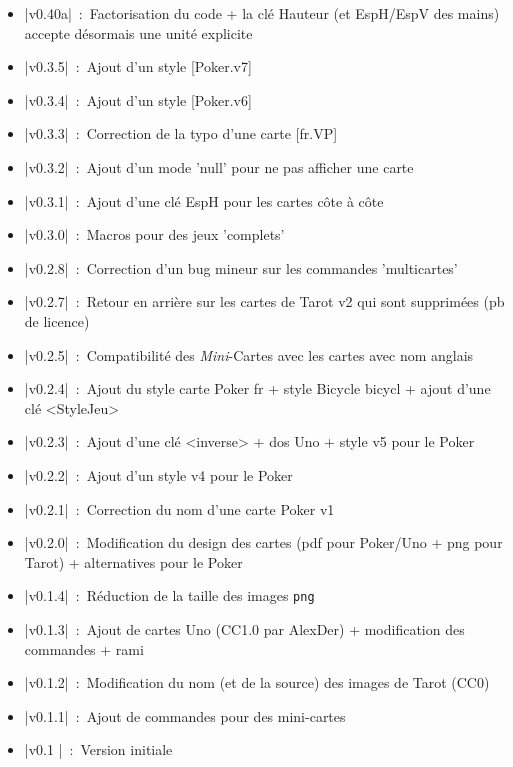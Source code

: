 \documentclass[a4paper]{article}
\begin{document}
{\small
\begin{itemize}[nosep,leftmargin=1.5em,itemindent=0pt]
  \item \bverb|v0.40a|~:~Factorisation du code + la clé \textsf{Hauteur} (et \textsf{EspH}/\textsf{EspV} des mains) accepte désormais une unité explicite
  \item \bverb|v0.3.5|~:~Ajout d'un style [Poker.v7]
  \item \bverb|v0.3.4|~:~Ajout d'un style [Poker.v6]
  \item \bverb|v0.3.3|~:~Correction de la typo d'une carte [fr.VP]
  \item \bverb|v0.3.2|~:~Ajout d'un mode 'null' pour ne pas afficher une carte
  \item \bverb|v0.3.1|~:~Ajout d'une clé \textsf{EspH} pour les cartes côte à côte
  \item \bverb|v0.3.0|~:~Macros pour des jeux 'complets'
  \item \bverb|v0.2.8|~:~Correction d'un bug mineur sur les commandes 'multicartes'
  \item \bverb|v0.2.7|~:~Retour en arrière sur les cartes de Tarot \textsf{v2} qui sont supprimées (pb de licence)
  \item \bverb|v0.2.5|~:~Compatibilité des \textit{Mini}-Cartes avec les cartes avec nom anglais
  \item \bverb|v0.2.4|~:~Ajout du style carte Poker \textsf{fr} + style Bicycle \textsf{bicycl} + ajout d'une clé \textsf{<StyleJeu>}
  \item \bverb|v0.2.3|~:~Ajout d'une clé \textsf{<inverse>} + dos Uno + style \textsf{v5} pour le Poker
  \item \bverb|v0.2.2|~:~Ajout d'un style \textsf{v4} pour le Poker
  \item \bverb|v0.2.1|~:~Correction du nom d'une carte Poker \textsf{v1}
  \item \bverb|v0.2.0|~:~Modification du design des cartes (pdf pour Poker/Uno + png pour Tarot) + alternatives pour le Poker
  \item \bverb|v0.1.4|~:~Réduction de la taille des images \texttt{png}
  \item \bverb|v0.1.3|~:~Ajout de cartes Uno (CC1.0 par AlexDer) + modification des commandes + rami
  \item \bverb|v0.1.2|~:~Modification du nom (et de la source) des images de Tarot (CC0)
  \item \bverb|v0.1.1|~:~Ajout de commandes pour des mini-cartes
  \item \bverb|v0.1  |~:~Version initiale
\end{itemize}
}
\end{document}
